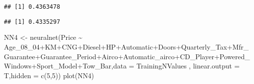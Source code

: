 \documentclass[
]{article}
\newenvironment{Shaded}{\begin{snugshade}}{\end{snugshade}}
\newcommand{\AttributeTok}[1]{\textcolor[rgb]{0.77,0.63,0.00}{#1}}
\newcommand{\DecValTok}[1]{\textcolor[rgb]{0.00,0.00,0.81}{#1}}
\newcommand{\FunctionTok}[1]{\textcolor[rgb]{0.00,0.00,0.00}{#1}}
\newcommand{\NormalTok}[1]{#1}
\newcommand{\OtherTok}[1]{\textcolor[rgb]{0.56,0.35,0.01}{#1}}
\newcommand{\SpecialCharTok}[1]{\textcolor[rgb]{0.00,0.00,0.00}{#1}}
\begin{document}
\begin{Shaded}
\end{Shaded}

\begin{verbatim}
## [1] 0.4363478
\end{verbatim}

\begin{Shaded}
\end{Shaded}

\begin{verbatim}
## [1] 0.4335297
\end{verbatim}

\begin{Shaded}
\begin{Highlighting}[]
\NormalTok{NN4 }\OtherTok{\textless{}{-}} \FunctionTok{neuralnet}\NormalTok{(Price }\SpecialCharTok{\textasciitilde{}}\NormalTok{ Age\_08\_04}\SpecialCharTok{+}\NormalTok{KM}\SpecialCharTok{+}\NormalTok{CNG}\SpecialCharTok{+}\NormalTok{Diesel}\SpecialCharTok{+}\NormalTok{HP}\SpecialCharTok{+}\NormalTok{Automatic}\SpecialCharTok{+}\NormalTok{Doors}\SpecialCharTok{+}\NormalTok{Quarterly\_Tax}\SpecialCharTok{+}\NormalTok{Mfr\_Guarantee}\SpecialCharTok{+}\NormalTok{Guarantee\_Period}\SpecialCharTok{+}\NormalTok{Airco}\SpecialCharTok{+}\NormalTok{Automatic\_airco}\SpecialCharTok{+}\NormalTok{CD\_Player}\SpecialCharTok{+}\NormalTok{Powered\_Windows}\SpecialCharTok{+}\NormalTok{Sport\_Model}\SpecialCharTok{+}\NormalTok{Tow\_Bar,}\AttributeTok{data =}\NormalTok{ TrainingNValues , }\AttributeTok{linear.output =}\NormalTok{ T,}\AttributeTok{hidden =} \FunctionTok{c}\NormalTok{(}\DecValTok{5}\NormalTok{,}\DecValTok{5}\NormalTok{))}
\FunctionTok{plot}\NormalTok{(NN4)}
\end{Highlighting}
\end{Shaded}
\end{document}
